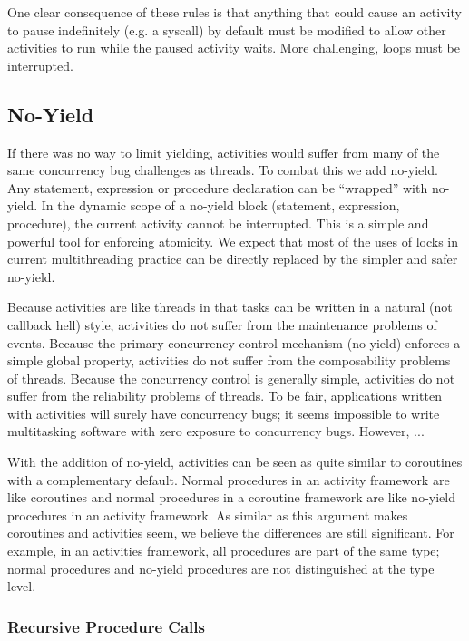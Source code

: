 \documentclass[10pt,preprint]{sigplanconf}
\begin{document}
One clear consequence of these rules is that anything that could cause an activity to pause indefinitely (e.g. a syscall) by default must be modified to allow other activities to run while the paused activity waits.
More challenging, loops must be interrupted.

\subsection{No-Yield}

If there was no way to limit yielding, activities would suffer from many of the same concurrency bug challenges as threads.
To combat this we add no-yield.
Any statement, expression or procedure declaration can be ``wrapped'' with no-yield.
In the dynamic scope of a no-yield block (statement, expression, procedure), the current activity cannot be interrupted.
This is a simple and powerful tool for enforcing atomicity.
We expect that most of the uses of locks in current multithreading practice can be directly replaced by the simpler and safer no-yield.

Because activities are like threads in that tasks can be written in a natural (not callback hell) style, activities do not suffer from the maintenance problems of events.
Because the primary concurrency control mechanism (no-yield) enforces a simple global property, activities do not suffer from the composability problems of threads.
Because the concurrency control is generally simple, activities do not suffer from the reliability problems of threads.
To be fair, applications written with activities will surely have concurrency bugs; it seems impossible to write multitasking software with zero exposure to concurrency bugs.
However, ...

With the addition of no-yield, activities can be seen as quite similar to coroutines with a complementary default.
Normal procedures in an activity framework are like coroutines and normal procedures in a coroutine framework are like no-yield procedures in an activity framework.
As similar as this argument makes coroutines and activities seem, we believe the differences are still significant.
For example, in an activities framework, all procedures are part of the same type; normal procedures and no-yield procedures are not distinguished at the type level.

\subsubsection{Recursive Procedure Calls}
\end{document}
